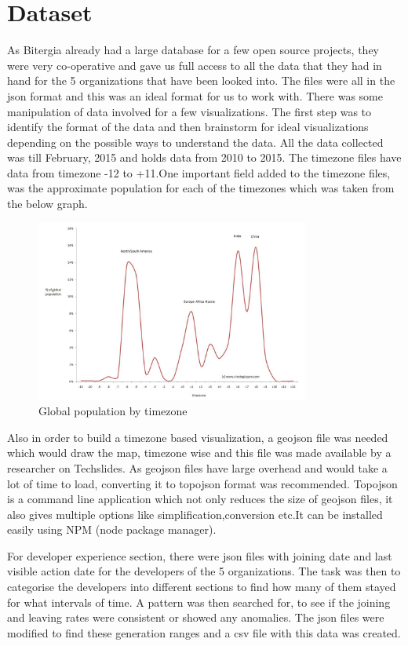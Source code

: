 \documentclass[seploa]{beavtex}
\begin{document}
\section{Dataset}
As Bitergia already had a large database for a few open source projects, they were very co-operative and gave us full access to all the data that they had in hand for the 5 organizations that have been looked into. The files were all in the json format and this was an ideal format for us to work with. There was some manipulation of data involved for a few visualizations. The first step was to identify the format of the data and then brainstorm for ideal visualizations depending on the possible ways to understand the data. All the data collected was till February, 2015 and holds data from 2010 to 2015. The timezone files have data from timezone -12 to +11.One important field added to the timezone files, was the approximate population for each of the timezones which was taken from the below graph.

\begin{figure}[!ht]
\centering
\includegraphics[width=90mm]{pop1.jpg}
\caption{Global population by timezone}
\end{figure}

Also in order to build a timezone based visualization, a geojson file was needed which would draw the map, timezone wise and this file was made available by a researcher on Techslides. As geojson files have large overhead and would take a lot of time to load, converting it to topojson format was recommended\cite{tech}. Topojson is a command line application which not only reduces the size of geojson files, it also gives multiple options like simplification,conversion etc.It can be installed easily using NPM (node package manager). 

For developer experience section, there were json files with joining date and last visible action date for the developers of the 5 organizations. The task was then to categorise the developers into different sections to find how many of them stayed for what intervals of time. A pattern was then searched for, to see if the joining and leaving rates were consistent or showed any anomalies. The json files were modified to find these generation ranges and a csv file with this data was created.
\end{document}
